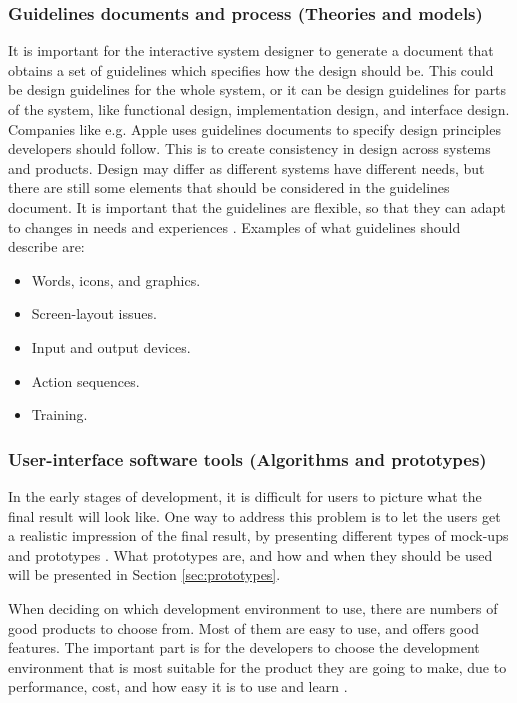 \subsubsection{Guidelines documents and process (Theories and models)}
It is important for the interactive system designer to generate a document that obtains a set of guidelines which specifies how the design should be. This could be design guidelines for the whole system, or it can be design guidelines for parts of the system, like functional design, implementation design, and interface design. Companies like e.g. Apple uses guidelines documents to specify design principles developers should follow. This is to create consistency in design across systems and products. Design may differ as different systems have different needs, but there are still some elements that should be considered in the guidelines document. It is important that the guidelines are flexible, so that they can adapt to changes in needs and experiences \cite{mmi}. Examples of what guidelines should describe are:

\begin{itemize}
\renewcommand{\labelitemi}{$\bullet$}
\item Words, icons, and graphics.
\item Screen-layout issues.
\item Input and output devices.
\item Action sequences.
\item Training.
\end{itemize}

\subsubsection{User-interface software tools (Algorithms and prototypes)}
In the early stages of development, it is difficult for users to picture what the final result will look like. One way to address this problem is to let the users get a realistic impression of the final result, by presenting different types of mock-ups and prototypes \cite{mmi}. What prototypes are, and how and when they should be used will be presented in Section \ref{sec:prototypes}. 

When deciding on which development environment to use, there are numbers of good products to choose from. Most of them are easy to use, and offers good features. The important part is for the developers to choose the development environment that is most suitable for the product they are going to make, due to performance, cost, and how easy it is to use and learn \cite{mmi}.
	
